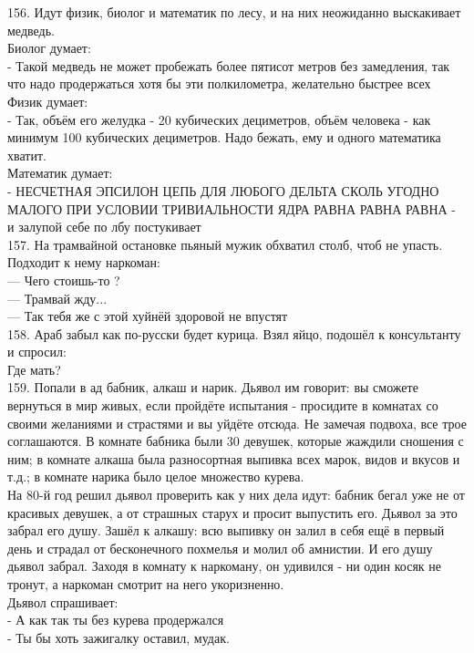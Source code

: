 \documentclass[a4paper,20pt,notitlepage]{extbook}
\begin{document}
	156. Идут физик, биолог и математик по лесу, и на них неожиданно выскакивает медведь.\\
	Биолог думает:\\
	- Такой медведь не может пробежать более пятисот метров без замедления, так что надо продержаться хотя бы эти полкилометра, желательно быстрее всех\\
	Физик думает:\\
	- Так, объём его желудка - 20 кубических дециметров, объём человека - как минимум 100 кубических дециметров. Надо бежать, ему и одного математика хватит.\\
	Математик думает:\\
	- НЕСЧЕТНАЯ ЭПСИЛОН ЦЕПЬ ДЛЯ ЛЮБОГО ДЕЛЬТА СКОЛЬ УГОДНО МАЛОГО ПРИ УСЛОВИИ ТРИВИАЛЬНОСТИ ЯДРА РАВНА РАВНА РАВНА - и залупой себе по лбу постукивает\\
	
	157. На трамвайной остановке пьяный мужик обхватил столб, чтоб не упасть. Подходит к нему наркоман:\\
	— Чего стоишь-то ?\\
	— Трамвай жду...\\
	— Так тебя же с этой хуйнёй здоровой не впустят\\
	
	158. Араб забыл как по-русски будет курица. Взял яйцо, подошёл к консультанту и спросил:\\
	Где мать?\\
	
	159. Попали в ад бабник, алкаш и нарик. Дьявол им говорит: вы сможете вернуться в мир живых, если пройдёте испытания - просидите в комнатах со своими желаниями и страстями и вы уйдёте отсюда. Не замечая подвоха, все трое соглашаются.
	В комнате бабника были 30 девушек, которые жаждили сношения с ним; в комнате алкаша была разносортная выпивка всех марок, видов и вкусов и т.д.; в комнате нарика было целое множество курева.\\
	На 80-й год решил дьявол проверить как у них дела идут: бабник бегал уже не от красивых девушек, а от страшных старух и просит выпустить его. Дьявол за это забрал его душу. Зашёл к алкашу: всю выпивку он залил в себя ещё в первый день и страдал от бесконечного похмелья и молил об амнистии. И его душу дьявол забрал. Заходя в комнату к наркоману, он удивился - ни один косяк не тронут, а наркоман смотрит на него укоризненно.\\
	Дьявол спрашивает:\\
	- А как так ты без курева продержался\\
	- Ты бы хоть зажигалку оставил, мудак.\\
	
\end{document}
